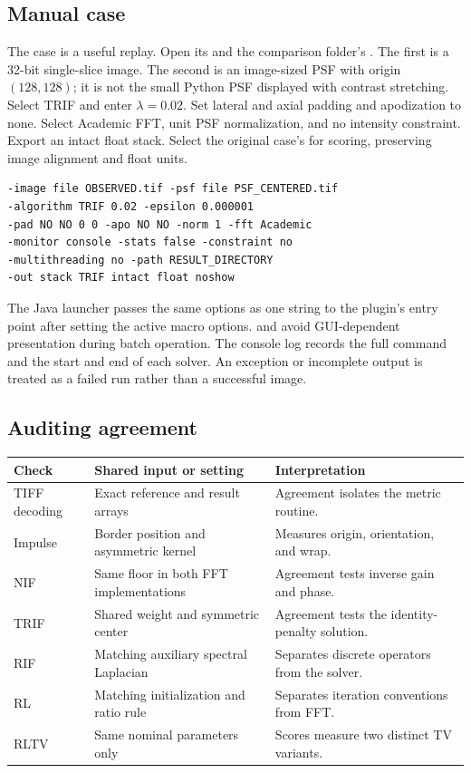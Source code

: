 \subsection{Manual case}

The case  is a useful replay. Open its  and the comparison folder's . The first is a 32-bit single-slice image. The second is an image-sized PSF with origin \((128,128)\); it is not the small Python PSF displayed with contrast stretching. Select TRIF and enter \(\lambda=0.02\). Set lateral and axial padding and apodization to none. Select Academic FFT, unit PSF normalization, and no intensity constraint. Export an intact float stack. Select the original case's  for scoring, preserving image alignment and float units.

\begin{lstlisting}[style=paper,caption={Option string for the main TRIF example. Paths stand for the shared float TIFFs.},
label={lst:ijargs}]
-image file OBSERVED.tif -psf file PSF_CENTERED.tif
-algorithm TRIF 0.02 -epsilon 0.000001
-pad NO NO 0 0 -apo NO NO -norm 1 -fft Academic
-monitor console -stats false -constraint no
-multithreading no -path RESULT_DIRECTORY
-out stack TRIF intact float noshow
\end{lstlisting}

The Java launcher passes the same options as one string to the plugin's entry point after setting the active macro options.  and  avoid GUI-dependent presentation during batch operation. The console log records the full command and the start and end of each solver. An exception or incomplete output is treated as a failed run rather than a successful image.

\subsection{Auditing agreement}

\begin{tabularx}{\linewidth}{@{}lYY@{}}
\toprule Check & Shared input or setting & Interpretation\\\midrule
TIFF decoding & Exact reference and result arrays & Agreement isolates the metric routine.\\
Impulse & Border position and asymmetric kernel & Measures origin, orientation, and wrap.\\
NIF & Same floor in both FFT implementations & Agreement tests inverse gain and phase.\\
TRIF & Shared weight and symmetric center & Agreement tests the identity-penalty solution.\\
RIF & Matching auxiliary spectral Laplacian & Separates discrete operators from the solver.\\
RL & Matching initialization and ratio rule & Separates iteration conventions from FFT.\\
RLTV & Same nominal parameters only & Scores measure two distinct TV variants.\\
\bottomrule
\end{tabularx}

